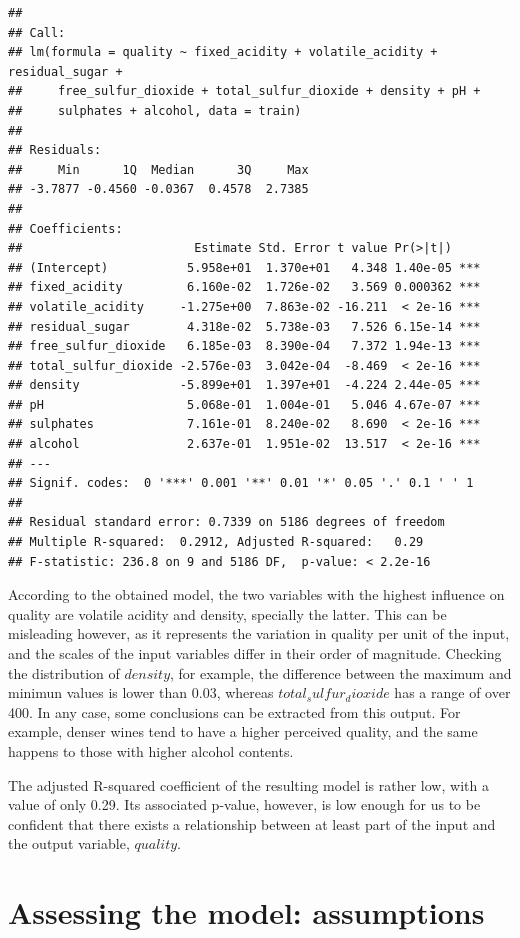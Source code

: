 \documentclass[12pt,]{article}
\begin{document}
\begin{verbatim}
## 
## Call:
## lm(formula = quality ~ fixed_acidity + volatile_acidity + residual_sugar + 
##     free_sulfur_dioxide + total_sulfur_dioxide + density + pH + 
##     sulphates + alcohol, data = train)
## 
## Residuals:
##     Min      1Q  Median      3Q     Max 
## -3.7877 -0.4560 -0.0367  0.4578  2.7385 
## 
## Coefficients:
##                        Estimate Std. Error t value Pr(>|t|)    
## (Intercept)           5.958e+01  1.370e+01   4.348 1.40e-05 ***
## fixed_acidity         6.160e-02  1.726e-02   3.569 0.000362 ***
## volatile_acidity     -1.275e+00  7.863e-02 -16.211  < 2e-16 ***
## residual_sugar        4.318e-02  5.738e-03   7.526 6.15e-14 ***
## free_sulfur_dioxide   6.185e-03  8.390e-04   7.372 1.94e-13 ***
## total_sulfur_dioxide -2.576e-03  3.042e-04  -8.469  < 2e-16 ***
## density              -5.899e+01  1.397e+01  -4.224 2.44e-05 ***
## pH                    5.068e-01  1.004e-01   5.046 4.67e-07 ***
## sulphates             7.161e-01  8.240e-02   8.690  < 2e-16 ***
## alcohol               2.637e-01  1.951e-02  13.517  < 2e-16 ***
## ---
## Signif. codes:  0 '***' 0.001 '**' 0.01 '*' 0.05 '.' 0.1 ' ' 1
## 
## Residual standard error: 0.7339 on 5186 degrees of freedom
## Multiple R-squared:  0.2912, Adjusted R-squared:   0.29 
## F-statistic: 236.8 on 9 and 5186 DF,  p-value: < 2.2e-16
\end{verbatim}

According to the obtained model, the two variables with the highest
influence on quality are volatile acidity and density, specially the
latter. This can be misleading however, as it represents the variation
in quality per unit of the input, and the scales of the input variables
differ in their order of magnitude. Checking the distribution of
\(density\), for example, the difference between the maximum and minimun
values is lower than 0.03, whereas \(total_sulfur_dioxide\) has a range
of over 400. In any case, some conclusions can be extracted from this
output. For example, denser wines tend to have a higher perceived
quality, and the same happens to those with higher alcohol contents.

The adjusted R-squared coefficient of the resulting model is rather low,
with a value of only 0.29. Its associated p-value, however, is low
enough for us to be confident that there exists a relationship between
at least part of the input and the output variable, \(quality\).

\section{Assessing the model:
assumptions}\label{assessing-the-model-assumptions}
\end{document}
